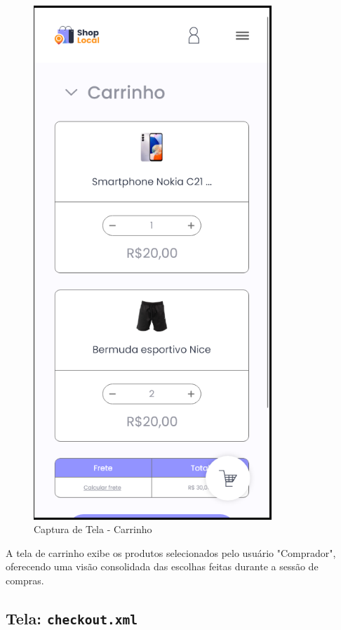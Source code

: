 \documentclass[
	12pt,				%
	openright,			%
	twoside,			%
	a4paper,			%
	english,			%
	brazil				%
	]{abntex2}
\begin{document}
\begin{figure}[htb]
    \centering
    \includegraphics[width=0.8\textwidth]{img/carrinho}
    \caption{Captura de Tela - Carrinho}
\end{figure}

A tela de carrinho exibe os produtos selecionados pelo usuário "Comprador", oferecendo uma visão consolidada das escolhas feitas durante a sessão de compras.

\subsection{Tela: \texttt{checkout.xml}}
\end{document}
